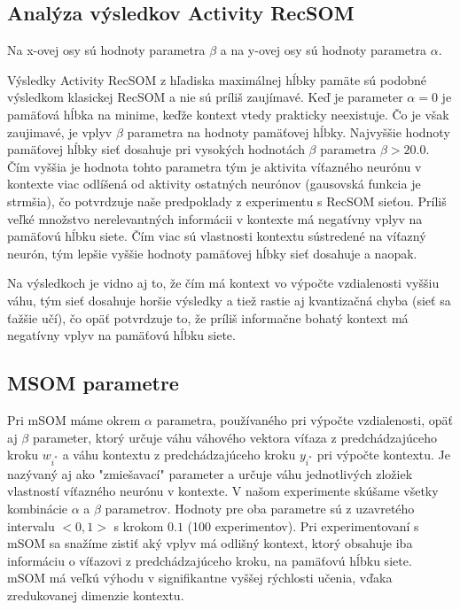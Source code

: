 \subsection{Analýza výsledkov Activity RecSOM}
Na x-ovej osy sú hodnoty parametra $\beta$ a na y-ovej osy sú hodnoty parametra $\alpha$.

Výsledky Activity RecSOM z hľadiska maximálnej hĺbky pamäte sú podobné výsledkom klasickej RecSOM a nie sú príliš 
zaujímavé. Keď je parameter $\alpha = 0$ je pamäťová hĺbka na minime, keďže kontext vtedy prakticky neexistuje.
Čo je však zaujimavé, je vplyv $\beta$ parametra na hodnoty pamäťovej hĺbky. Najvyššie hodnoty pamäťovej hĺbky sieť 
dosahuje pri vysokých hodnotách $\beta$ parametra $\beta > 20.0$. Čím vyššia je hodnota tohto parametra tým je aktivita
víťazného neurónu v kontexte viac odlíšená od aktivity ostatných neurónov (gausovská funkcia je strmšia), čo potvrdzuje naše predpoklady z 
experimentu s RecSOM sieťou. Príliš veľké množstvo nerelevantných informácii v kontexte má negatívny vplyv na pamäťovú hĺbku siete.
Čím viac sú vlastnosti kontextu sústredené na víťazný neurón, tým lepšie vyššie hodnoty pamäťovej hĺbky sieť dosahuje a naopak.

Na výsledkoch je vidno aj to, že čím má kontext vo výpočte vzdialenosti vyššiu váhu, tým sieť dosahuje horšie 
výsledky a tiež rastie aj kvantizačná chyba (sieť sa ťažšie učí), čo opäť potvrdzuje to, že príliš informačne bohatý kontext má negatívny vplyv
na pamäťovú hĺbku siete.


\subsection{MSOM parametre}
Pri mSOM máme okrem $\alpha$ parametra, používaného pri výpočte vzdialenosti, opäť aj $\beta$ parameter, ktorý určuje váhu
váhového vektora víťaza z predchádzajúceho kroku $w_{i^{*}}$ a váhu kontextu
z predchádzajúceho kroku $y_{i^{*}}$ pri výpočte kontextu. Je nazývaný aj ako "zmiešavací" parameter
a určuje váhu jednotlivých zložiek vlastností víťazného neurónu v kontexte.
V našom experimente skúšame všetky kombinácie $\alpha$ a $\beta$ parametrov.
Hodnoty pre oba parametre sú z uzavretého intervalu $<0, 1>$ s krokom $0.1$ (100 experimentov).
Pri experimentovaní s mSOM sa snažíme zistiť aký vplyv má odlišný kontext, ktorý obsahuje iba informáciu
o víťazovi z predchádzajúceho kroku, na pamäťovú hĺbku siete. mSOM má veľkú výhodu v signifikantne 
vyššej rýchlosti učenia, vďaka zredukovanej dimenzie kontextu.

